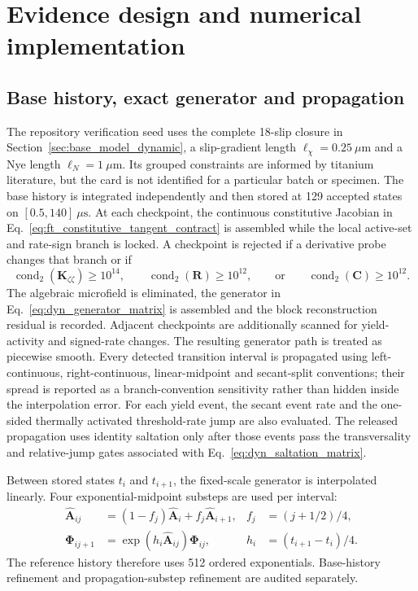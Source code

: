 \section{Evidence design and numerical implementation}
\label{sec:numerical_dynamic}

\subsection{Base history, exact generator and propagation}

The repository verification seed uses the complete 18-slip closure in Section~\ref{sec:base_model_dynamic}, a slip-gradient length $\ell_\chi=0.25~\mu\mathrm m$ and a Nye length $\ell_N=1~\mu\mathrm m$. Its grouped constraints are informed by titanium literature, but the card is not identified for a particular batch or specimen. The base history is integrated independently and then stored at 129 accepted states on $[0.5,140]~\mu\mathrm s$. At each checkpoint, the continuous constitutive Jacobian in Eq.~\eqref{eq:ft_constitutive_tangent_contract} is assembled while the local active-set and rate-sign branch is locked. A checkpoint is rejected if a derivative probe changes that branch or if
\begin{equation}
 \operatorname{cond}_2(\boldsymbol K_{\zeta\zeta})\ge10^{14},
 \qquad
 \operatorname{cond}_2(\boldsymbol R)\ge10^{12},
 \qquad\text{or}\qquad
 \operatorname{cond}_2(\boldsymbol C)\ge10^{12}.
 \label{eq:dyn_conditioning_gates}
\end{equation}
The algebraic microfield is eliminated, the generator in Eq.~\eqref{eq:dyn_generator_matrix} is assembled and the block reconstruction residual is recorded. Adjacent checkpoints are additionally scanned for yield-activity and signed-rate changes. The resulting generator path is treated as piecewise smooth. Every detected transition interval is propagated using left-continuous, right-continuous, linear-midpoint and secant-split conventions; their spread is reported as a branch-convention sensitivity rather than hidden inside the interpolation error.  For each yield event, the secant event rate and the one-sided thermally activated threshold-rate jump are also evaluated.  The released propagation uses identity saltation only after those events pass the transversality and relative-jump gates associated with Eq.~\eqref{eq:dyn_saltation_matrix}.

Between stored states $t_i$ and $t_{i+1}$, the fixed-scale generator is interpolated linearly. Four exponential-midpoint substeps are used per interval:
\begin{align}
 \widehat{\boldsymbol A}_{ij}
 &=(1-f_j)\widehat{\boldsymbol A}_i+f_j\widehat{\boldsymbol A}_{i+1},
 &f_j&=(j+1/2)/4,\\
 \boldsymbol\Phi_{ij+1}
 &=\exp(h_i\widehat{\boldsymbol A}_{ij})\boldsymbol\Phi_{ij},
 &h_i&=(t_{i+1}-t_i)/4.
 \label{eq:ft_midpoint_product}
\end{align}
The reference history therefore uses 512 ordered exponentials. Base-history refinement and propagation-substep refinement are audited separately.

